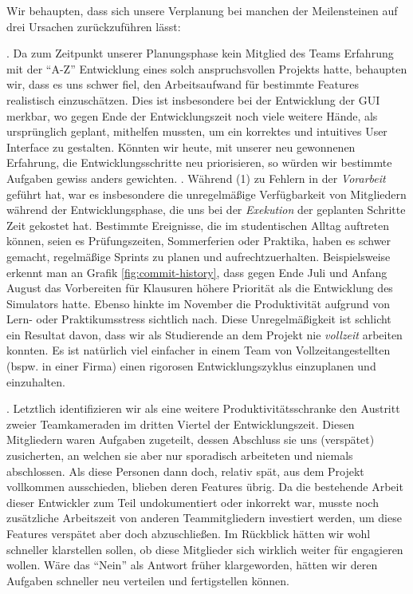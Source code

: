 \pagebreak
Wir behaupten, dass sich unsere Verplanung bei manchen der Meilensteinen auf drei Ursachen zurückzuführen lässt:

\begin{enumerate}

  . Da zum Zeitpunkt
  unserer Planungsphase kein Mitglied des Teams Erfahrung mit der ``A-Z''
  Entwicklung eines solch anspruchsvollen Projekts hatte, behaupten wir, dass es
  uns schwer fiel, den Arbeitsaufwand für bestimmte Features realistisch
  einzuschätzen. Dies ist insbesondere bei der Entwicklung der GUI merkbar, wo
  gegen Ende der Entwicklungszeit noch viele weitere Hände, als ursprünglich
  geplant, mithelfen mussten, um ein korrektes und intuitives User Interface zu
  gestalten. Könnten wir heute, mit unserer neu gewonnenen Erfahrung, die
  Entwicklungsschritte neu priorisieren, so würden wir bestimmte Aufgaben gewiss
  anders gewichten. . Während (1) zu Fehlern
  in der \emph{Vorarbeit} geführt hat, war es insbesondere die unregelmäßige
  Verfügbarkeit von Mitgliedern während der Entwicklungsphase, die uns bei der
  \emph{Exekution} der geplanten Schritte Zeit gekostet hat. Bestimmte
  Ereignisse, die im studentischen Alltag auftreten können, seien es
  Prüfungszeiten, Sommerferien oder Praktika, haben es schwer gemacht,
  regelmäßige Sprints zu planen und aufrechtzuerhalten. Beispielsweise erkennt
  man an Grafik \ref{fig:commit-history}, dass gegen Ende Juli und Anfang August
  das Vorbereiten für Klausuren höhere Priorität als die Entwicklung des
  Simulators hatte. Ebenso hinkte im November die Produktivität aufgrund von
  Lern- oder Praktikumsstress sichtlich nach. Diese Unregelmäßigkeit ist
  schlicht ein Resultat davon, dass wir als Studierende an dem Projekt nie
  \emph{vollzeit} arbeiten konnten. Es ist natürlich viel einfacher in einem
  Team von Vollzeitangestellten (bspw. in einer Firma) einen rigorosen
  Entwicklungszyklus einzuplanen und einzuhalten.

  . Letztlich identifizieren wir als eine
  weitere Produktivitätsschranke den Austritt zweier Teamkameraden im dritten
  Viertel der Entwicklungszeit. Diesen Mitgliedern waren Aufgaben zugeteilt,
  dessen Abschluss sie uns (verspätet) zusicherten, an welchen sie aber nur
  sporadisch arbeiteten und niemals abschlossen. Als diese Personen dann doch,
  relativ spät, aus dem Projekt vollkommen ausschieden, blieben deren Features
  übrig. Da die bestehende Arbeit dieser Entwickler zum Teil undokumentiert oder
  inkorrekt war, musste noch zusätzliche Arbeitszeit von anderen Teammitgliedern
  investiert werden, um diese Features verspätet aber doch abzuschließen. Im Rückblick hätten wir wohl schneller klarstellen sollen, ob diese Mitglieder sich wirklich weiter für \erasim{} engagieren wollen. Wäre das ``Nein'' als Antwort früher klargeworden, hätten wir deren Aufgaben schneller neu verteilen und fertigstellen können.

\end{enumerate}

